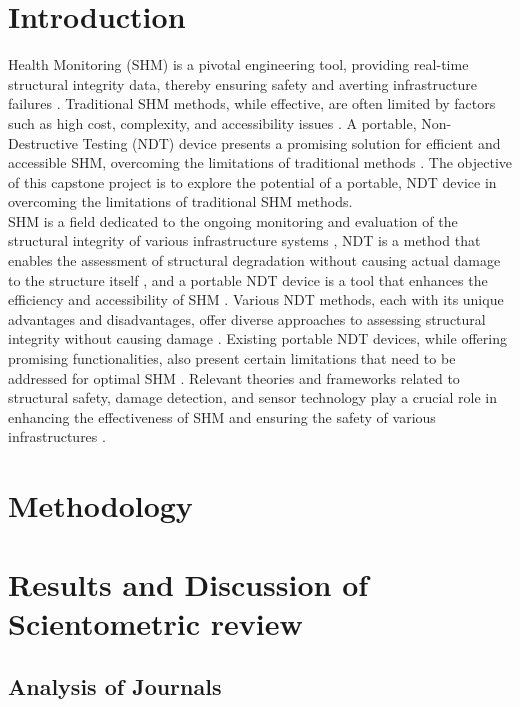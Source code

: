 \documentclass[journal, a4paper]{IEEEtran}
\begin{document}
\section{Introduction}
 Health Monitoring (SHM) is a pivotal engineering tool, providing real-time structural integrity data,
thereby ensuring safety and averting infrastructure failures \cite{Gharehbaghi2022} \cite{Katam2023}.
Traditional SHM methods, while effective, are often limited by factors such as
high cost, complexity, and accessibility issues \cite{Katam2023} \cite{Gharehbaghi2022}.
A portable, Non-Destructive Testing (NDT) device presents a promising solution for efficient and accessible SHM,
overcoming the limitations of traditional methods \cite{Guo2022} \cite{Chen2023}.
The objective of this capstone project is to explore the potential of a portable,
NDT device in overcoming the limitations of traditional SHM methods.
\\
SHM is a field dedicated to the ongoing monitoring and evaluation of the structural integrity
of various infrastructure systems \cite{Katam2023}, NDT is a method that enables the assessment
of structural degradation without causing actual damage to the structure itself \cite{Katam2023},
and a portable NDT device is a tool that enhances the efficiency and accessibility of SHM \cite{Hassani2023} \cite{Katam2023}.
Various NDT methods, each with its unique advantages and disadvantages,
offer diverse approaches to assessing structural integrity without causing damage \cite{Dolati2021} \cite{Verma2013}.
Existing portable NDT devices, while offering promising functionalities,
also present certain limitations that need to be addressed for optimal SHM \cite{Hassani2023} \cite{Zhu2011}.
Relevant theories and frameworks related to structural safety, damage detection,
and sensor technology play a crucial role in enhancing the effectiveness of SHM
and ensuring the safety of various infrastructures \cite{Chen2021} \cite{Gharehbaghi2022}.


\section{Methodology}
\lipsum[3]


\section{Results and Discussion of Scientometric review}
\lipsum[1]


\subsection{Analysis of Journals}
\lipsum[1]
\end{document}
